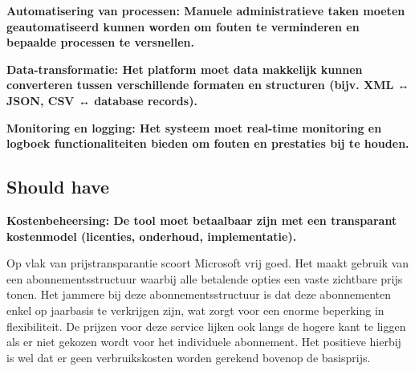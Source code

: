 \vspace{\baselineskip}



\vspace{\baselineskip}

\textbf{Automatisering van processen: Manuele administratieve taken moeten geautomatiseerd kunnen worden om fouten te verminderen en bepaalde processen te versnellen.}

\vspace{\baselineskip}



\vspace{\baselineskip}
\textbf{Data-transformatie: Het platform moet data makkelijk kunnen converteren tussen verschillende formaten en structuren (bijv. XML ↔ JSON, CSV ↔ database records).}

\vspace{\baselineskip}



\vspace{\baselineskip}


\textbf{Monitoring en logging: Het systeem moet real-time monitoring en logboek functionaliteiten bieden om fouten en prestaties bij te houden.}

\vspace{\baselineskip}



\vspace{\baselineskip}

\subsection{Should have}%
\label{ShouldHaveMicrosoft}

\textbf{Kostenbeheersing: De tool moet betaalbaar zijn met een transparant kostenmodel (licenties, onderhoud, implementatie).}

\vspace{\baselineskip}

Op vlak van prijstransparantie scoort Microsoft vrij goed. Het maakt gebruik van een abonnementsstructuur waarbij alle betalende opties een vaste zichtbare prijs tonen. Het jammere bij deze abonnementsstructuur is dat deze abonnementen enkel op jaarbasis te verkrijgen zijn, wat zorgt voor een enorme beperking in flexibiliteit.  De prijzen voor deze service lijken ook langs de hogere kant te liggen als er niet gekozen wordt voor het individuele abonnement. Het positieve hierbij is wel dat er geen verbruikskosten worden gerekend bovenop de basisprijs.

